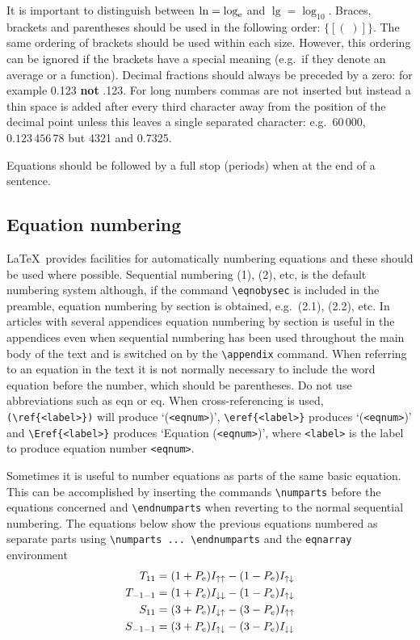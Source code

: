 \documentclass[12pt]{iopart}
\begin{document}
It is important to distinguish between $\ln = \log_{\mathrm{e}}$ and $\lg 
=\log_{10}$. Braces, brackets and parentheses should be used in the 
following order: $\{[(\;)]\}$. The same ordering of brackets should be 
used within each size. However, this ordering can be ignored if the
brackets have a 
special meaning (e.g.\ if they denote an average or a function).  Decimal 
fractions should 
always be preceded by a zero: for example 0.123 {\bf not} .123. For long 
numbers commas are not inserted but instead a thin space is added after 
every third character away from the position of the decimal point unless 
this leaves a single separated character: e.g.\ $60\,000$, $0.123\,456\,78$ 
but 4321 and 0.7325.

Equations should be followed by a full stop (periods) when at the end
of a sentence.

\subsection{Equation numbering}
\label{eqnum}
\LaTeX\ provides facilities for automatically numbering equations 
and these should be used where possible. Sequential numbering (1), (2), 
etc, is the default numbering system although, if the command
\verb"\eqnobysec" is included in the preamble, equation numbering
by section is obtained, e.g.\ 
(2.1), (2.2), etc. In articles with several appendices equation numbering
by section is useful in the appendices even when sequential numbering has
been used throughout the main body of the text and is switched on by the 
\verb"\appendix" command. When referring to an equation in the text it is not normally necessary to include the word equation before the number, 
which should be parentheses. Do not 
use abbreviations such as eqn or eq.
When cross-referencing is used, \verb"(\ref{<label>})"
 will produce `(\verb"<eqnum>")',
\verb"\eref{<label>}" produces `(\verb"<eqnum>")' and
\verb"\Eref{<label>}" produces `Equation (\verb"<eqnum>")', 
where \verb"<label>" is the label to produce equation number \verb"<eqnum>".

Sometimes it is useful to number equations as parts of the same
basic equation. This can be accomplished by inserting the 
commands \verb"\numparts" before the equations concerned and 
\verb"\endnumparts" when reverting to the normal sequential numbering.
The equations below show the previous equations numbered as separate parts
using \verb"\numparts ... \endnumparts" and the \verb"eqnarray"
environment
\numparts
\begin{eqnarray}
T_{11}&=(1+P_{\mathrm{e}})I_{\uparrow\uparrow}-(1-P_{\mathrm{e}})
I_{\uparrow\downarrow}\\
T_{-1-1}&=(1+P_{\mathrm{e}})I_{\downarrow\downarrow}-(1-P_{\mathrm{e}})I_{\uparrow\downarrow}\\
S_{11}&=(3+P_{\mathrm{e}})I_{\downarrow\uparrow}-(3-P_e)I_{\uparrow\uparrow}\\
S_{-1-1}&=(3+P_{\mathrm{e}})I_{\uparrow\downarrow}-(3-P_{\mathrm{e}})
I_{\downarrow\downarrow}
\end{eqnarray}
\endnumparts
\end{document}
